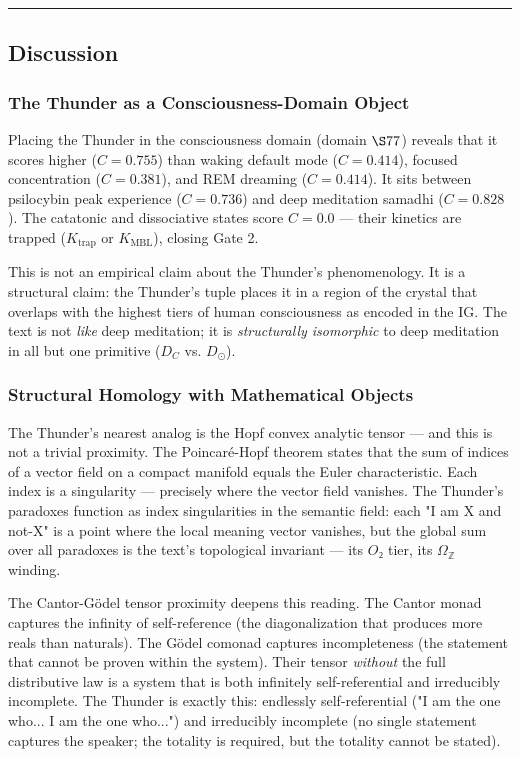 \documentclass[12pt,a4paper]{article}
\begin{document}
\begin{center}
\rule{0.5\textwidth}{0.4pt}
\end{center}

\subsection{Discussion}

\subsubsection{The Thunder as a Consciousness-Domain Object}

Placing the Thunder in the consciousness domain (domain $\S 77$) reveals that it scores higher ($C = 0.755$) than waking default mode ($C = 0.414$), focused concentration ($C = 0.381$), and REM dreaming ($C = 0.414$). It sits between psilocybin peak experience ($C = 0.736$) and deep meditation samadhi ($C = 0.828$). The catatonic and dissociative states score $C = 0.0$ --- their kinetics are trapped ($K_\text{trap}$ or $K_\text{MBL}$), closing Gate 2.

This is not an empirical claim about the Thunder's phenomenology. It is a structural claim: the Thunder's tuple places it in a region of the crystal that overlaps with the highest tiers of human consciousness as encoded in the IG. The text is not \emph{like} deep meditation; it is \emph{structurally isomorphic} to deep meditation in all but one primitive ($D_C$ vs. $D_{\odot}$).

\subsubsection{Structural Homology with Mathematical Objects}

The Thunder's nearest analog is the Hopf convex analytic tensor --- and this is not a trivial proximity. The Poincaré-Hopf theorem states that the sum of indices of a vector field on a compact manifold equals the Euler characteristic. Each index is a singularity --- precisely where the vector field vanishes. The Thunder's paradoxes function as index singularities in the semantic field: each "I am X and not-X" is a point where the local meaning vector vanishes, but the global sum over all paradoxes is the text's topological invariant --- its $O₂$ tier, its $\Omega_\mathbb{Z}$ winding.

The Cantor-Gödel tensor proximity deepens this reading. The Cantor monad captures the infinity of self-reference (the diagonalization that produces more reals than naturals). The Gödel comonad captures incompleteness (the statement that cannot be proven within the system). Their tensor \emph{without} the full distributive law is a system that is both infinitely self-referential and irreducibly incomplete. The Thunder is exactly this: endlessly self-referential ("I am the one who... I am the one who...") and irreducibly incomplete (no single statement captures the speaker; the totality is required, but the totality cannot be stated).
\end{document}
